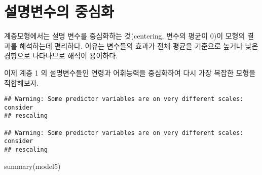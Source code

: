\documentclass[
]{book}
\newenvironment{Shaded}{\begin{snugshade}}{\end{snugshade}}
\newcommand{\AttributeTok}[1]{\textcolor[rgb]{0.77,0.63,0.00}{#1}}
\newcommand{\DecValTok}[1]{\textcolor[rgb]{0.00,0.00,0.81}{#1}}
\newcommand{\FunctionTok}[1]{\textcolor[rgb]{0.00,0.00,0.00}{#1}}
\newcommand{\NormalTok}[1]{#1}
\newcommand{\OtherTok}[1]{\textcolor[rgb]{0.56,0.35,0.01}{#1}}
\newcommand{\SpecialCharTok}[1]{\textcolor[rgb]{0.00,0.00,0.00}{#1}}
\begin{document}
\hypertarget{uxc124uxba85uxbcc0uxc218uxc758-uxc911uxc2ecuxd654}{%
\section{설명변수의 중심화}\label{uxc124uxba85uxbcc0uxc218uxc758-uxc911uxc2ecuxd654}}

계층모형에서는 설명 변수를 중심화하는 것(centering, 변수의 평균이 0)이 모형의 결과를 해석하는데 편리하다. 이유는 변수들의 효과가 전체 평균을 기준으로 높거나 낮은 경향으로 나타나므로 해석이 용이하다.

이제 계층 1 의 설명변수들인 연령과 어휘능력을 중심화하여 다시 가장 복잡한 모형을 적합해보자.

\begin{Shaded}
\end{Shaded}

\begin{verbatim}
## Warning: Some predictor variables are on very different scales: consider
## rescaling

## Warning: Some predictor variables are on very different scales: consider
## rescaling
\end{verbatim}

\begin{Shaded}
\begin{Highlighting}[]
\FunctionTok{summary}\NormalTok{(model5)}
\end{Highlighting}
\end{Shaded}
\end{document}

